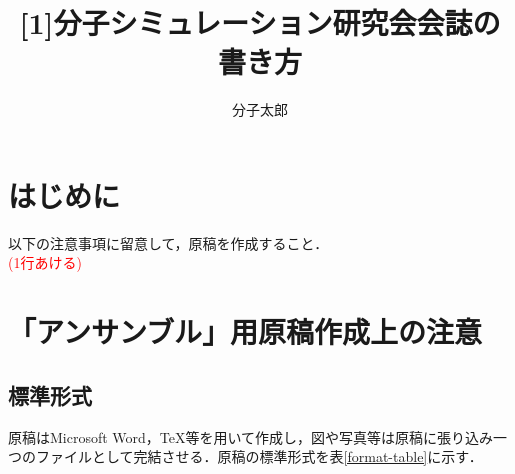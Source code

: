 \documentclass[twocolumn,10pt]{jarticle}
\title{%
[1]分子シミュレーション研究会会誌の書き方
}
\author{%
分子太郎
}
\affiliation{%
分子大学\quad シミュレーション学部
}
\begin{document}
\maketitle

\section{はじめに}
以下の注意事項に留意して，原稿を作成すること．\\
\textcolor{red}{(1行あける)}
%
\section{「アンサンブル」用原稿作成上の注意}

\subsection{標準形式}
原稿はMicrosoft Word，TeX等を用いて作成し，図や写真等は原稿に張り込み一つのファイルとして完結させる．原稿の標準形式を表\ref{format-table}に示す．
\end{document}
